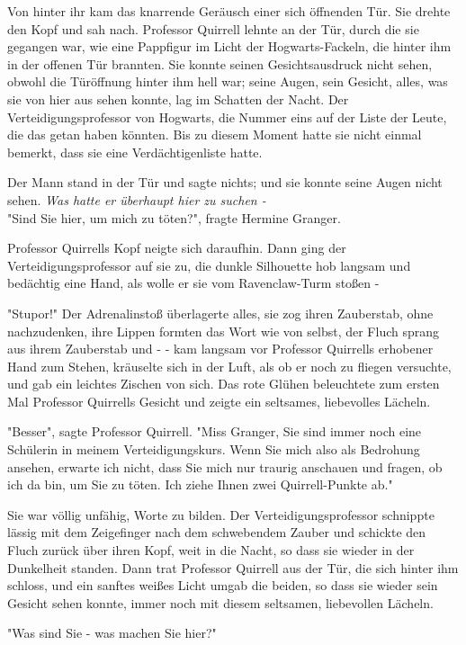 {Von hinter ihr kam das knarrende Geräusch einer sich öffnenden Tür. Sie drehte den Kopf und sah nach. Professor Quirrell lehnte an der Tür, durch die sie gegangen war, wie eine Pappfigur im Licht der Hogwarts-Fackeln, die hinter ihm in der offenen Tür brannten. Sie konnte seinen Gesichtsausdruck nicht sehen, obwohl die Türöffnung hinter ihm hell war; seine Augen, sein Gesicht, alles, was sie von hier aus sehen konnte, lag im Schatten der Nacht. Der Verteidigungsprofessor von Hogwarts, die Nummer eins auf der Liste der Leute, die das getan haben könnten. Bis zu diesem Moment hatte sie nicht einmal bemerkt, dass sie eine Verdächtigenliste hatte.

Der Mann stand in der Tür und sagte nichts; und sie konnte seine Augen nicht sehen. \emph{Was hatte er überhaupt hier zu suchen -}\\ "Sind Sie hier, um mich zu töten?", fragte Hermine Granger.

Professor Quirrells Kopf neigte sich daraufhin. Dann ging der Verteidigungsprofessor auf sie zu, die dunkle Silhouette hob langsam und bedächtig eine Hand, als wolle er sie vom Ravenclaw-Turm stoßen -

"Stupor!" Der Adrenalinstoß überlagerte alles, sie zog ihren Zauberstab, ohne nachzudenken, ihre Lippen formten das Wort wie von selbst, der Fluch sprang aus ihrem Zauberstab und - - kam langsam vor Professor Quirrells erhobener Hand zum Stehen, kräuselte sich in der Luft, als ob er noch zu fliegen versuchte, und gab ein leichtes Zischen von sich. Das rote Glühen beleuchtete zum ersten Mal Professor Quirrells Gesicht und zeigte ein seltsames, liebevolles Lächeln.

"Besser", sagte Professor Quirrell. "Miss Granger, Sie sind immer noch eine Schülerin in meinem Verteidigungskurs. Wenn Sie mich also als Bedrohung ansehen, erwarte ich nicht, dass Sie mich nur traurig anschauen und fragen, ob ich da bin, um Sie zu töten. Ich ziehe Ihnen zwei Quirrell-Punkte ab."

Sie war völlig unfähig, Worte zu bilden. Der Verteidigungsprofessor schnippte lässig mit dem Zeigefinger nach dem schwebendem Zauber und schickte den Fluch zurück über ihren Kopf, weit in die Nacht, so dass sie wieder in der Dunkelheit standen. Dann trat Professor Quirrell aus der Tür, die sich hinter ihm schloss, und ein sanftes weißes Licht umgab die beiden, so dass sie wieder sein Gesicht sehen konnte, immer noch mit diesem seltsamen, liebevollen Lächeln.

"Was sind Sie - was machen Sie hier?"

}
